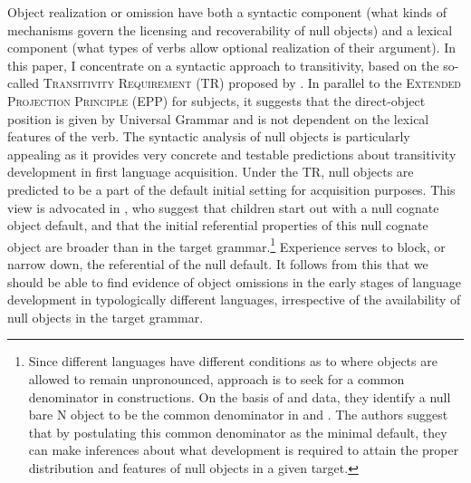 \documentclass[output=paper,modfonts,newtxmath,hidelinks,]{langscibook}
\begin{document}
\noindent Object realization or omission have both a syntactic component (what kinds of mechanisms govern the licensing and recoverability of null objects) and a lexical component (what types of verbs allow optional realization of their  argument). In this paper, I concentrate on a syntactic approach to transitivity, based on the so-called \textsc{Transitivity Requirement} (TR) proposed by \citet{Cummins-Roberge2005}. In parallel to the \textsc{Extended Projection Principle} (EPP) for subjects, it suggests that the direct-object position is given by Universal Grammar and is not dependent on the lexical features of the verb. The syntactic analysis of null objects is particularly appealing as it provides very concrete and testable predictions about transitivity development in first language acquisition. Under the TR, null objects are predicted to be a part of the default initial setting for acquisition purposes. This view is advocated in \citet{Perez-Leroux-etal2008}, who suggest that children start out with a null cognate object default, and that the initial referential properties of this null cognate object are broader than in the target grammar.\footnote{\label{17:fn2}Since different languages have different conditions as to where objects are allowed to remain unpronounced,  approach is to seek for a common denominator in  constructions. On the basis of  and  data, they identify a null bare N object to be the common denominator in  and . The authors suggest that by postulating this common denominator as the minimal default, they can make inferences about what development is required to attain the proper distribution and features of null objects in a given target.} Experience serves to block, or narrow down, the referential  of the null default. It follows from this that we should be able to find evidence of object omissions in the early stages of language development in typologically different languages, irrespective of the availability of null objects in the target grammar.
\end{document}
